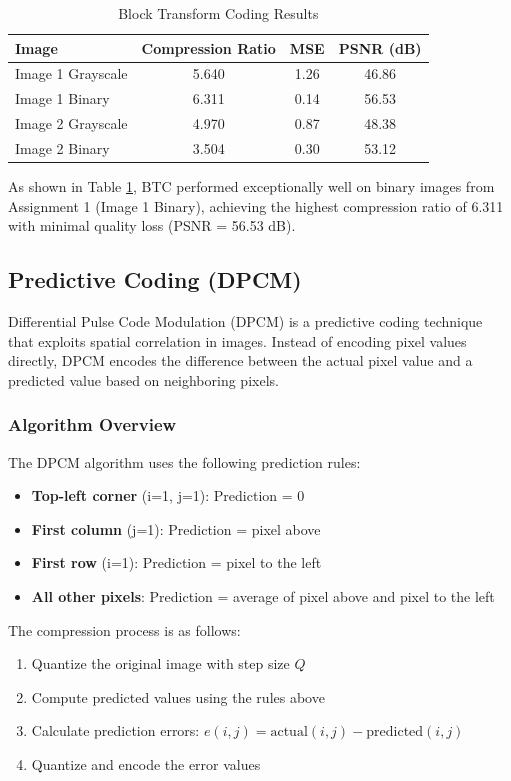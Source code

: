 \documentclass[12pt, a4paper]{AnantDocumentation}
\begin{document}
\begin{table}[h!]
	\centering
	\begin{tabular}{lccc}
		\toprule
		Image & Compression Ratio & MSE & PSNR (dB) \\
		\midrule
		Image 1 Grayscale & 5.640 & 1.26 & 46.86 \\
		Image 1 Binary & 6.311 & 0.14 & 56.53 \\
		Image 2 Grayscale & 4.970 & 0.87 & 48.38 \\
		Image 2 Binary & 3.504 & 0.30 & 53.12 \\
		\bottomrule
	\end{tabular}
	\caption{Block Transform Coding Results}
	\label{tab:btc-results}
\end{table}

As shown in Table \ref{tab:btc-results}, BTC performed exceptionally well on binary images from Assignment 1 (Image 1 Binary), achieving the highest compression ratio of 6.311 with minimal quality loss (PSNR = 56.53 dB).

\subsection{Predictive Coding (DPCM)}
\label{subsec:predictive-coding}
Differential Pulse Code Modulation (DPCM) is a predictive coding technique that exploits spatial correlation in images. Instead of encoding pixel values directly, DPCM encodes the difference between the actual pixel value and a predicted value based on neighboring pixels.

\subsubsection{Algorithm Overview}
The DPCM algorithm uses the following prediction rules:
\begin{itemize}
	\item \textbf{Top-left corner} (i=1, j=1): Prediction = 0
	\item \textbf{First column} (j=1): Prediction = pixel above
	\item \textbf{First row} (i=1): Prediction = pixel to the left
	\item \textbf{All other pixels}: Prediction = average of pixel above and pixel to the left
\end{itemize}

The compression process is as follows:
\begin{enumerate}
	\item Quantize the original image with step size $Q$
	\item Compute predicted values using the rules above
	\item Calculate prediction errors: $e(i,j) = \text{actual}(i,j) - \text{predicted}(i,j)$
	\item Quantize and encode the error values
\end{enumerate}
\end{document}
